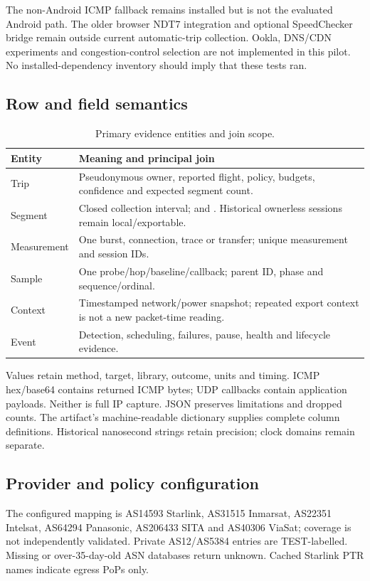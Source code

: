 The non-Android ICMP fallback  remains installed but is
not the evaluated Android path. The older browser NDT7 integration and optional
SpeedChecker bridge remain outside current automatic-trip collection. Ookla,
DNS/CDN experiments and congestion-control selection are not implemented in this
pilot. No installed-dependency inventory should imply that these tests ran.

\subsection{Row and field semantics}
\begin{table}[!htbp]
\centering\footnotesize
\caption{Primary evidence entities and join scope.}
\begin{tabularx}{\columnwidth}{@{}lY@{}}
\toprule
Entity & Meaning and principal join\\
\midrule
Trip & Pseudonymous owner, reported flight, policy, budgets, confidence and expected segment count.\\
Segment & Closed collection interval;  and . Historical ownerless sessions remain local/exportable.\\
Measurement & One burst, connection, trace or transfer; unique measurement and session IDs.\\
Sample & One probe/hop/baseline/callback; parent ID, phase and sequence/ordinal.\\
Context & Timestamped network/power snapshot; repeated export context is not a new packet-time reading.\\
Event & Detection, scheduling, failures, pause, health and lifecycle evidence.\\
\bottomrule
\end{tabularx}
\end{table}

Values retain method, target, library, outcome, units and timing. ICMP hex/base64
contains returned ICMP bytes; UDP callbacks contain application payloads. Neither
is full IP capture. JSON preserves limitations and dropped counts. The artifact's
machine-readable dictionary supplies complete column definitions. Historical
nanosecond strings retain precision; clock domains remain separate.

\subsection{Provider and policy configuration}
The configured mapping is AS14593 Starlink, AS31515 Inmarsat, AS22351 Intelsat,
AS64294 Panasonic, AS206433 SITA and AS40306 ViaSat; coverage is not independently
validated. Private AS12/AS5384 entries are TEST-labelled. Missing or over-35-day-old
ASN databases return unknown. Cached Starlink PTR names indicate egress PoPs only.

